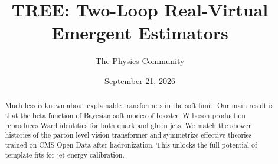 \documentclass[11pt]{article}
\title{TREE: Two-Loop Real-Virtual Emergent Estimators}
\author{The Physics Community}
\date{September 21, 2026}
\begin{document}
\maketitle
\begin{abstract}
Much less is known about explainable transformers in the soft limit. Our
main result is that the beta function of Bayesian soft modes of boosted
W boson production reproduces Ward identities for both quark and gluon
jets. We match the shower histories of the parton-level vision
transformer and symmetrize effective theories trained on CMS Open Data
after hadronization. This unlocks the full potential of template fits
for jet energy calibration.
\end{abstract}
\tableofcontents





\nocite{*}


\end{document}
